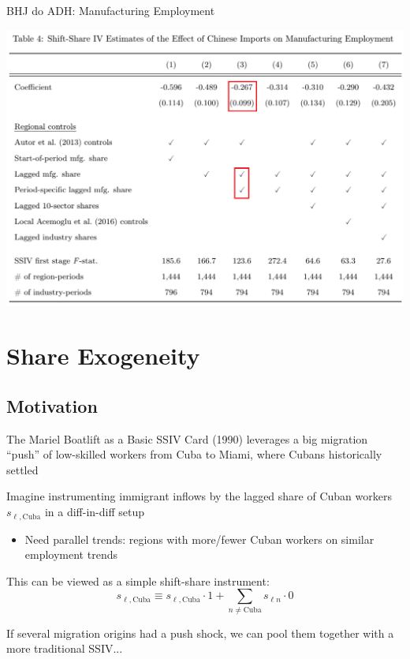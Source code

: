 \documentclass{beamer}
\begin{document}
\begin{frame}{BHJ do ADH: Manufacturing Employment}
\begin{center}
\includegraphics[scale=0.4]{lecture_includes/adh_bhj.png}
\end{center}
\end{frame}

\section{Share Exogeneity}

\subsection{Motivation}

\begin{frame}{The Mariel Boatlift as a Basic SSIV}
Card (1990) leverages a big migration ``push'' of low-skilled workers from Cuba to Miami, where Cubans historically settled
\medskip\pause{}

Imagine instrumenting immigrant inflows by the lagged share of Cuban workers $s_{\ell, \text{Cuba}}$ in a diff-in-diff setup\smallskip
	\begin{itemize}
	\item Need parallel trends: regions with more/fewer Cuban workers on similar employment trends
	\medskip\pause{}
	\end{itemize}	
This can be viewed as a simple shift-share instrument: $$s_{\ell, \text{Cuba}}\equiv s_{\ell,\text{Cuba}}\cdot 1+\sum_{n\ne\text{Cuba}} s_{\ell n}\cdot 0$$
\pause{}

\vspace{-0.4cm}If several migration origins had a push shock, we can pool them together with a more traditional SSIV...

\end{frame}
\end{document}
